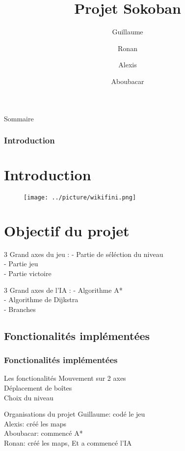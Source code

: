 \documentclass{beamer}
\title{Projet Sokoban}
\author{Guillaume \and Ronan \and Alexis \and Aboubacar}
\institute{Université de Caen Normandie \\ Conception logiciel}
\begin{document}
\begin{frame}
\titlepage
\end{frame}


\begin{frame}{Sommaire}
\tableofcontents
\end{frame}
\frametitle{Introduction}
\section{Introduction} 
\begin{frame}

\begin{figure}
        \centering
        \texttt{[image: ../picture/wikifini.png]}
\end{figure}
\end{frame}

\section{Objectif du projet}
\begin{frame}
\begin{block}{3 Grand axes du jeu :}
- Partie de séléction du niveau \\ 
- Partie jeu  \\
- Partie victoire \\
\end{block}
\begin{block}{3 Grand axes de l'IA :}
- Algorithme A* \\
- Algorithme de Dijkstra \\
- Branches 
\end{block}
\end{frame}


\begin{frame}
\section{Fonctionalités implémentées}
\frametitle{Fonctionalités implémentées}
\begin{block}{Les fonctionalités}
Mouvement sur 2 axes \\
Déplacement de boîtes \\
Choix du niveau 
\end{block}
\begin{block}{Organisations du projet}
Guillaume: codé le jeu \\ 
Alexis: créé les maps \\
Aboubacar: commencé A*  \\
Ronan: créé les maps, Et a commencé l'IA
\end{block}
\end{frame}
\end{document}
